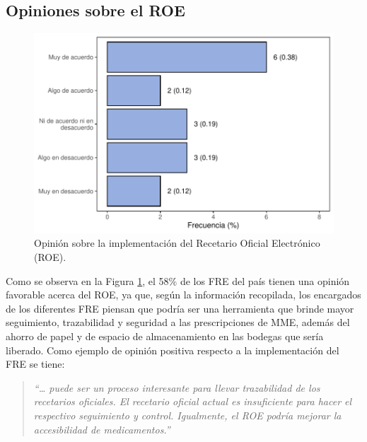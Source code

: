 \documentclass[
  oneside]{book}
\begin{document}
\hypertarget{opiniones-sobre-el-roe}{%
\subsection{Opiniones sobre el ROE}\label{opiniones-sobre-el-roe}}

\begin{figure}[t]

{\centering \includegraphics[width=0.85\linewidth]{InformeFinal_files/figure-latex/FREImplementacionROE-1} 

}

\caption{Opinión sobre la implementación del Recetario Oficial Electrónico (ROE).}\label{fig:FREImplementacionROE}
\end{figure}

Como se observa en la Figura \ref{fig:FREImplementacionROE}, el 58\% de los FRE del país tienen una opinión favorable acerca del ROE, ya que, según la información recopilada, los encargados de los diferentes FRE piensan que podría ser una herramienta que brinde mayor seguimiento, trazabilidad y seguridad a las prescripciones de MME, además del ahorro de papel y de espacio de almacenamiento en las bodegas que sería liberado. Como ejemplo de opinión positiva respecto a la implementación del FRE se tiene:

\begin{quote}
\emph{``\ldots{} puede ser un proceso interesante para llevar trazabilidad de los recetarios oficiales. El recetario oficial actual es insuficiente para hacer el respectivo seguimiento y control. Igualmente, el ROE podría mejorar la accesibilidad de medicamentos.''}
\end{quote}
\end{document}
